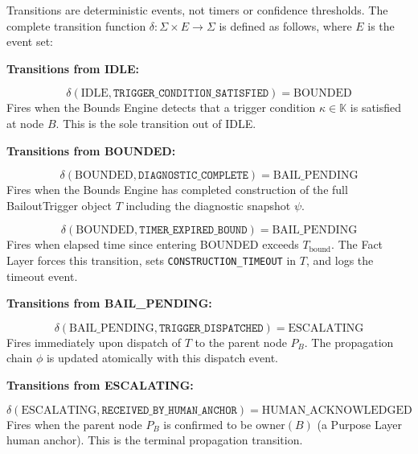 \documentclass[12pt]{article}
\begin{document}
Transitions are deterministic events, not timers or confidence thresholds. The complete transition function $\delta : \Sigma \times E \rightarrow \Sigma$ is defined as follows, where $E$ is the event set:

\bigskip

\textbf{Transitions from IDLE:}

\begin{equation}
\delta(\text{IDLE}, \texttt{TRIGGER\_CONDITION\_SATISFIED}) = \text{BOUNDED}
\end{equation}
Fires when the Bounds Engine detects that a trigger condition $\kappa \in \mathbb{K}$ is satisfied at node $B$. This is the sole transition out of IDLE.

\bigskip

\textbf{Transitions from BOUNDED:}

\begin{equation}
\delta(\text{BOUNDED}, \texttt{DIAGNOSTIC\_COMPLETE}) = \text{BAIL\_PENDING}
\end{equation}
Fires when the Bounds Engine has completed construction of the full BailoutTrigger object $T$ including the diagnostic snapshot $\psi$.

\begin{equation}
\delta(\text{BOUNDED}, \texttt{TIMER\_EXPIRED\_BOUND}) = \text{BAIL\_PENDING}
\end{equation}
Fires when elapsed time since entering BOUNDED exceeds $T_{\text{bound}}$. The Fact Layer forces this transition, sets \texttt{CONSTRUCTION\_TIMEOUT} in $T$, and logs the timeout event.

\bigskip

\textbf{Transitions from BAIL\_PENDING:}

\begin{equation}
\delta(\text{BAIL\_PENDING}, \texttt{TRIGGER\_DISPATCHED}) = \text{ESCALATING}
\end{equation}
Fires immediately upon dispatch of $T$ to the parent node $P_B$. The propagation chain $\phi$ is updated atomically with this dispatch event.

\bigskip

\textbf{Transitions from ESCALATING:}

\begin{equation}
\delta(\text{ESCALATING}, \texttt{RECEIVED\_BY\_HUMAN\_ANCHOR}) = \text{HUMAN\_ACKNOWLEDGED}
\end{equation}
Fires when the parent node $P_B$ is confirmed to be $\text{owner}(B)$ (a Purpose Layer human anchor). This is the terminal propagation transition.
\end{document}
